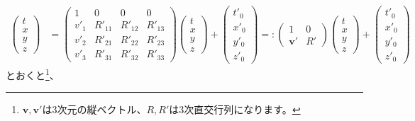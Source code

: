 \begin{align*}
\begin{pmatrix}
    t\\x\\y\\z
  \end{pmatrix}&=
  \begin{pmatrix}
    1 & 0 & 0 & 0 \\
    v'_1 & R'_{11} & R'_{12} & R'_{13} \\
    v'_2 & R'_{21} & R'_{22} & R'_{23} \\
    v'_3 & R'_{31} & R'_{32} & R'_{33}
  \end{pmatrix}
  \begin{pmatrix}
    t\\x\\y\\z
  \end{pmatrix}
  +
  \begin{pmatrix}
    t'_0\\x'_0\\y'_0\\z'_0
  \end{pmatrix}=:
  \begin{pmatrix}
    1 & 0 \\
    \mathbf{v}' & R'
  \end{pmatrix}
  \begin{pmatrix}
    t\\x\\y\\z
  \end{pmatrix}
  +
  \begin{pmatrix}
    t'_0\\x'_0\\y'_0\\z'_0
  \end{pmatrix}
\end{align*}
とおくと\footnote{
  $\mathbf{v},\mathbf{v}'$は3次元の縦ベクトル、$R,R'$は3次直交行列になります。
}、
